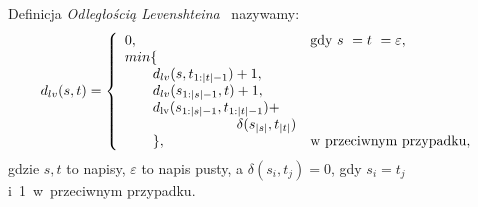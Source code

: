 \documentclass[11pt,pdftex,mathserif]{beamer}
\theoremstyle{definition}
\begin{document}
\begin{frame}
\begin{block}{Definicja}
\emph{Odległością Levenshteina}~\cite{Levenshtein1965:binarycodes} nazywamy:
$$
d_{lv}(s, t) = \left\{
\begin{array}{l l}     
    0, & \text{gdy } s~= t~= \varepsilon,\\
    min\{ & \\
\qquad    d_{lv}(s, t_{1:|t|-1}) + 1, & \\
\qquad    d_{lv}(s_{1:|s|-1}, t) + 1, & \\
\qquad    d_{\mathrm{lv}}(s_{1:|s|-1}, t_{1:|t|-1}) +\\  
\qquad\qquad\qquad\qquad     \delta(s_{|s|}, t_{|t|}) & \\
\qquad    \}, & \text{w przeciwnym przypadku},
\end{array}\right.
$$
gdzie $s, t$ to napisy, $\varepsilon$ to napis pusty, a $\delta(s_{i}, t_{j}) = 0$, gdy $s_i = t_j$ i~1~w~przeciwnym przypadku. 
\end{block}
\end{frame}

%
%
%
\end{document}
